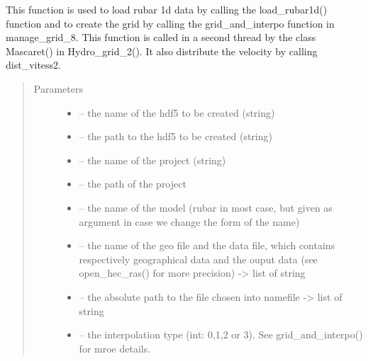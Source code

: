 \documentclass[letterpaper,10pt,english]{sphinxmanual}
\begin{document}
\begin{fulllineitems}
\label{\detokenize{index:src.rubar.load_rubar1d_and_create_grid}}
This function is used to load rubar 1d data by calling the load\_rubar1d() function and to create the grid
by calling the grid\_and\_interpo function in manage\_grid\_8. This function is called in a second thread by the class
Mascaret() in Hydro\_grid\_2(). It also distribute the velocity by calling dist\_vitess2.
\begin{quote}\begin{description}
\item[{Parameters}] \leavevmode\begin{itemize}
\item {} 
 -- the name of the hdf5 to be created (string)

\item {} 
 -- the path to the hdf5 to be created (string)

\item {} 
 -- the name of the project (string)

\item {} 
 -- the path of the project

\item {} 
 -- the name of the model (rubar in most case, but given as argument in case we change
the form of the name)

\item {} 
 -- the name of the geo file and the data file, which contains respectively geographical data and
the ouput data (see open\_hec\_ras() for more precision) -\textgreater{} list of string

\item {} 
 -- the absolute path to the file chosen into namefile -\textgreater{} list of string

\item {} 
 -- the interpolation type (int: 0,1,2 or 3). See grid\_and\_interpo() for mroe details.


\end{itemize}
\end{description}
\end{quote}
\end{fulllineitems}
\end{document}

